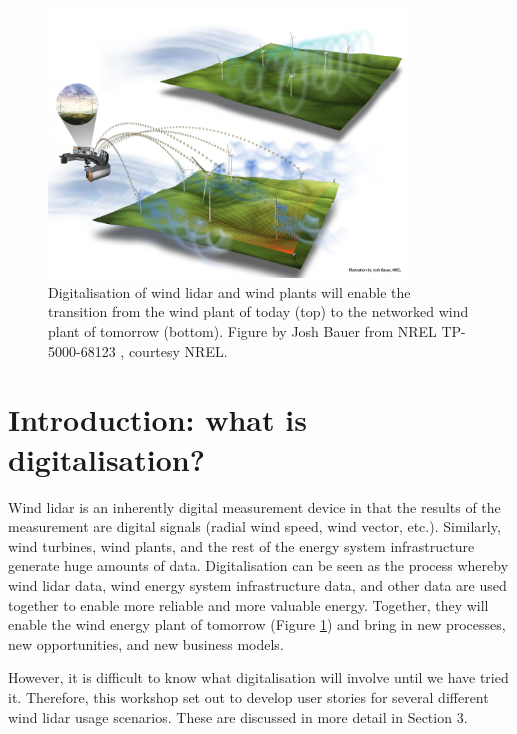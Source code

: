 \begin{figure}[!ht]
    \centering
    \includegraphics[width=0.85\textwidth]{figures/NRELTP-5000-68123-Fig4.png}
    \caption{Digitalisation of wind lidar and wind plants will enable the transition from the wind plant of today (top) to the networked wind plant of tomorrow (bottom). Figure by Josh Bauer from NREL TP-5000-68123 \cite{osti_1378902}, courtesy NREL.}
    \label{fig:digital_windplant}
\end{figure}

\section{Introduction: what is digitalisation?}

Wind lidar is an inherently digital measurement device in that the results of the measurement are digital signals (radial wind speed, wind vector, etc.). Similarly, wind turbines, wind plants, and the rest of the energy system infrastructure generate huge amounts of data. Digitalisation can be seen as the process whereby wind lidar data, wind energy system infrastructure data, and other data are used together to enable more reliable and more valuable energy. Together, they will enable the wind energy plant of tomorrow (Figure \ref{fig:digital_windplant}) and bring in new processes, new opportunities, and new business models.

However, it is difficult to know what digitalisation will involve until we have tried it. Therefore, this workshop set out to develop user stories for several different wind lidar usage scenarios. These are discussed in more detail in Section 3.